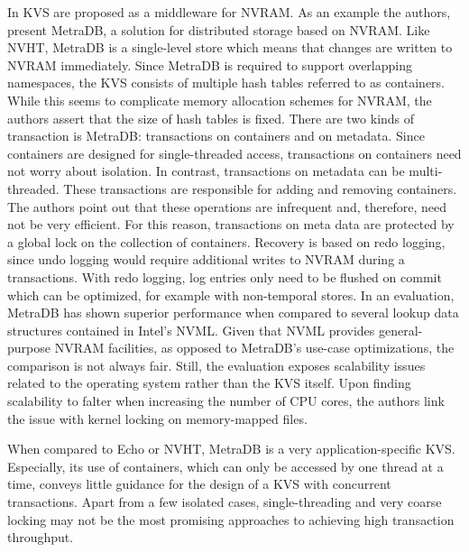 In \cite{marmol2016nonvolatile} \ac{KVS} are proposed as a middleware for
\ac{NVRAM}. As an example the authors, present MetraDB, a solution for
distributed storage based on \ac{NVRAM}. Like NVHT, MetraDB is a single-level
store which means that changes are written to \ac{NVRAM} immediately. Since
MetraDB is required to support overlapping namespaces, the \ac{KVS} consists of
multiple hash tables referred to as containers. While this seems to complicate
memory allocation schemes for \ac{NVRAM}, the authors assert that the size of
hash tables is fixed. There are two kinds of transaction is MetraDB:
transactions on containers and on metadata. Since containers are designed for
single-threaded access, transactions on containers need not worry about
isolation. In contrast, transactions on metadata can be multi-threaded. These
transactions are responsible for adding and removing containers. The authors
point out that these operations are infrequent and, therefore, need not be very
efficient. For this reason, transactions on meta data are protected by a global
lock on the collection of containers. Recovery is based on redo logging, since
undo logging would require additional writes to \ac{NVRAM} during a
transactions. With redo logging, log entries only need to be flushed on commit
which can be optimized, for example with non-temporal stores. In an evaluation,
MetraDB has shown superior performance when compared to several lookup data
structures contained in Intel's NVML. Given that NVML provides general-purpose
\ac{NVRAM} facilities, as opposed to MetraDB's use-case optimizations, the
comparison is not always fair. Still, the evaluation exposes scalability issues
related to the operating system rather than the \ac{KVS} itself. Upon finding
scalability to falter when increasing the number of \ac{CPU} cores, the authors
link the issue with kernel locking on memory-mapped files.

When compared to Echo or NVHT, MetraDB is a very application-specific \ac{KVS}.
Especially, its use of containers, which can only be accessed by one thread at a
time, conveys little guidance for the design of a \ac{KVS} with concurrent
transactions. Apart from a few isolated cases, single-threading and very coarse
locking may not be the most promising approaches to achieving high transaction
throughput.
